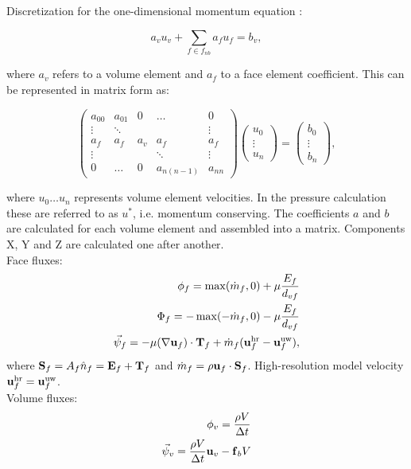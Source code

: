 \documentclass[12pt]{article}
\newcommand{\vb}[1]{\text{\textbf{#1}}}
\begin{document}
Discretization for the one-dimensional momentum equation \cite{mou}:

\begin{equation}
  a_v u_v + \sum_{f \in f_{nb}} a_f u_f = b_v,
\end{equation}

where $a_v$ refers to a volume element and $a_f$ to a face element coefficient. This can be represented in matrix form as:

$$
\begin{pmatrix}
  a_{00} & a_{01} & 0 & \dots & 0 \\
  \vdots & \ddots & &  & \vdots \\
  a_f & a_f & a_v & a_f & a_f \\
  \vdots & &  & \ddots & \vdots \\
  0 & \dots & 0 & a_{n (n - 1)} & a_{nn}
\end{pmatrix}
\begin{pmatrix}
  u_0 \\
  \vdots \\
  u_n
\end{pmatrix} =
\begin{pmatrix}
  b_{0} \\
  \vdots \\
  b_n
\end{pmatrix},
$$

where $u_0 \dots u_n$ represents volume element velocities. In the pressure calculation these are referred to as $u^*$, i.e. momentum conserving. The coefficients $a$ and $b$ are calculated for each volume element and assembled into a matrix. Components X, Y and Z are calculated one after another.\\

Face fluxes:
\begin{align}
  \phi_f = \max(\dot m_f, 0) + \mu \frac{E_f}{d_{vf}} \\
  \Phi_f = -\max(-\dot m_f, 0) - \mu \frac{E_f}{d_{vf}} \\
  \vec \psi_f = - \mu (\nabla \vb u_f) \cdot \vb T_f + \dot m_f (\vb u_f^{\text{hr}} - \vb u_f^{\text{uw}}),
\end{align}
where $\vb S_f = A_f \hat n_f = \vb E_f + \vb T_f$ and $\dot m_f = \rho \vb u_f \cdot \vb S_f$. High-resolution model velocity $\vb u_f^{\text{hr}} = \vb u_f^{\text{uw}}$.\\

Volume fluxes:
\begin{align}
  \phi_v = \frac{\rho V}{\Delta t} \\
  \vec \psi_v = \frac{\rho V}{\Delta t} \vb u_v - \vb f_b V
\end{align}
\end{document}
